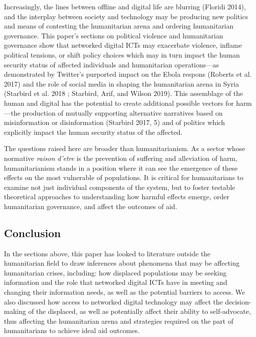 \documentclass[
]{article}
\begin{document}
Increasingly, the lines between offline and digital life are blurring
(Floridi 2014), and the interplay between society and technology may be
producing new politics and means of contesting the humanitarian arena
and ordering humanitarian governance. This paper's sections on political
violence and humanitarian governance show that networked digital ICTs
may exacerbate violence, inflame political tensions, or shift policy
choices which may in turn impact the human security status of affected
individuals and humanitarian operations---as demonstrated by Twitter's
purported impact on the Ebola respons (Roberts et al. 2017) and the role
of social media in shaping the humanitarian arena in Syria (Starbird et
al. 2018 ; Starbird, Arif, and Wilson 2019). This assemblage of the
human and digital has the potential to create additional possible
vectors for harm---the production of mutually supporting alternative
narratives based on misinformation or disinformation (Starbird 2017, 5)
and of politics which explicitly impact the human security status of the
affected.

The questions raised here are broader than humanitarianism. As a sector
whose normative \emph{raison d'etre} is the prevention of suffering and
alleviation of harm, humanitarianism stands in a position where it can
see the emergence of these effects on the most vulnerable of
populations. It is critical for humanitarians to examine not just
individual components of the system, but to foster testable theoretical
approaches to understanding how harmful effects emerge, order
humanitarian governance, and affect the outcomes of aid.

\hypertarget{conclusion}{%
\subsection{Conclusion}\label{conclusion}}

In the sections above, this paper has looked to literature outside the
humanitarian field to draw inferences about phenomena that may be
affecting humanitarian crises, including: how displaced populations may
be seeking information and the role that networked digital ICTs have in
meeting and changing their information needs, as well as the potential
barriers to access. We also discussed how access to networked digital
technology may affect the decision-making of the displaced, as well as
potentially affect their ability to self-advocate, thus affecting the
humanitarian arena and strategies required on the part of humanitarians
to achieve ideal aid outcomes.
\end{document}

